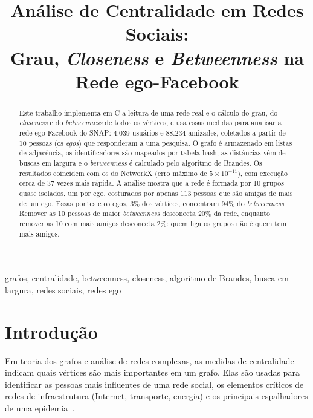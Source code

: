 \documentclass[conference]{IEEEtran}
\begin{document}
\title{Análise de Centralidade em Redes Sociais:\\ Grau, \textit{Closeness} e \textit{Betweenness} na Rede ego-Facebook}

\author{
}

\maketitle

\begin{abstract}
Este trabalho implementa em C a leitura de uma rede real e o cálculo do grau, do \textit{closeness} e do \textit{betweenness} de todos os vértices, e usa essas medidas para analisar a rede ego-Facebook do SNAP: 4.039 usuários e 88.234 amizades, coletados a partir de 10 pessoas (os \textit{egos}) que responderam a uma pesquisa. O grafo é armazenado em listas de adjacência, os identificadores são mapeados por tabela hash, as distâncias vêm de buscas em largura e o \textit{betweenness} é calculado pelo algoritmo de Brandes. Os resultados coincidem com os do NetworkX (erro máximo de $5\times10^{-11}$), com execução cerca de 37 vezes mais rápida. A análise mostra que a rede é formada por 10 grupos quase isolados, um por ego, costurados por apenas 113 pessoas que são amigas de mais de um ego. Essas pontes e os egos, 3\% dos vértices, concentram 94\% do \textit{betweenness}. Remover as 10 pessoas de maior \textit{betweenness} desconecta 20\% da rede, enquanto remover as 10 com mais amigos desconecta 2\%: quem liga os grupos não é quem tem mais amigos.
\end{abstract}

\begin{IEEEkeywords}
grafos, centralidade, betweenness, closeness, algoritmo de Brandes, busca em largura, redes sociais, redes ego
\end{IEEEkeywords}

\section{Introdução}

Em teoria dos grafos e análise de redes complexas, as medidas de centralidade indicam quais vértices são mais importantes em um grafo. Elas são usadas para identificar as pessoas mais influentes de uma rede social, os elementos críticos de redes de infraestrutura (Internet, transporte, energia) e os principais espalhadores de uma epidemia~\cite{wasserman1994,freeman1978}.
\end{document}
